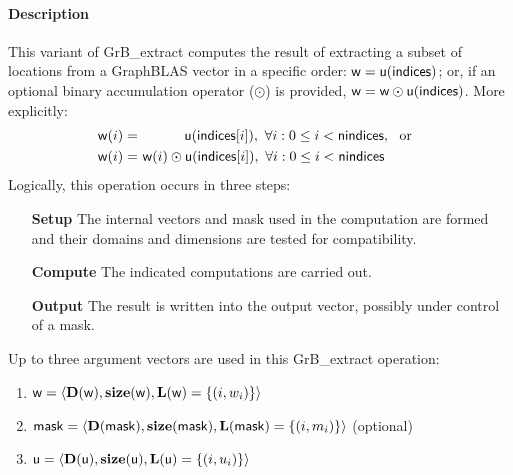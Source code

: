 \paragraph{Description}

This variant of {\sf GrB\_extract} computes the result of extracting a subset of
locations from a GraphBLAS vector in a specific order: 
${\sf w} = {\sf u}({\sf indices})$; or, if an optional binary accumulation 
operator ($\odot$) is provided, ${\sf w} = {\sf w} \odot {\sf u}({\sf indices})$.  
More explicitly:
\[
\begin{aligned}
    {\sf w}(i) = &\ \ \ \ \ \ \ \ \ \ {\sf u}({\sf indices}[i]),
    \ \forall i : 0 \leq i < {\sf nindices}, \mbox{~~or~~}
    \\
    {\sf w}(i) = &\ {\sf w}(i) \odot {\sf u}({\sf indices}[i]),
    \ \forall i : 0 \leq i < {\sf nindices}
\end{aligned}
\]
Logically, this operation occurs in three steps:
\begin{enumerate}[leftmargin=0.75in]
\item[\bf Setup] The internal vectors and mask used in the computation are formed 
and their domains and dimensions are tested for compatibility.
\item[\bf Compute] The indicated computations are carried out.
\item[\bf Output] The result is written into the output vector, possibly under 
control of a mask.
\end{enumerate}

Up to three argument vectors are used in this {\sf GrB\_extract} operation:
\begin{enumerate}
	\item ${\sf w} = \langle \bold{D}({\sf w}),\bold{size}({\sf w}),
    \bold{L}({\sf w}) = \{(i,w_i) \} \rangle$

	\item ${\sf mask} = \langle \bold{D}({\sf mask}),\bold{size}({\sf mask}),
    \bold{L}({\sf mask}) = \{(i,m_i) \} \rangle$ (optional)

	\item ${\sf u} = \langle \bold{D}({\sf u}),\bold{size}({\sf u}),
    \bold{L}({\sf u}) = \{(i,u_i) \} \rangle$
\end{enumerate}

